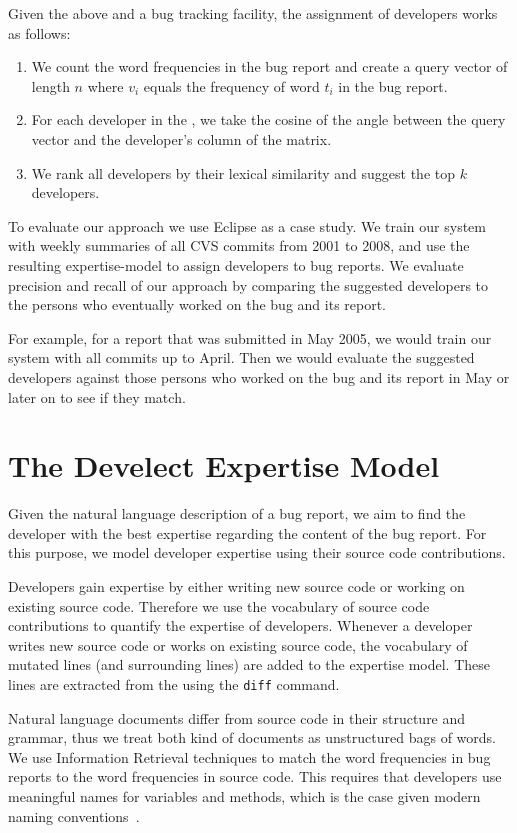 \documentclass[10pt]{book}
\begin{document}
Given the above \TAM and a bug tracking facility, the assignment of developers works as follows:

\begin{enumerate}
\item We count the word frequencies in the bug report and create a query vector of length $n$ where $v_i$ equals the frequency of word $t_i$ in the bug report. 
\item For each developer in the \TAM, we take the cosine of the angle between the query vector and the developer's column of the matrix.
\item We rank all developers by their lexical similarity and suggest the top $k$ developers.
\end{enumerate}

To evaluate our approach we use Eclipse as a case study. We train our system with weekly summaries of all CVS commits from 2001 to 2008, and use the resulting expertise-model to assign developers to bug reports. We evaluate precision and recall of our approach by comparing the suggested developers to the persons who eventually worked on the bug and its report.

For example, for a report that was submitted in May 2005, we would train our system with all commits up to April. Then we would evaluate the suggested developers against those persons who worked on the bug and its report in May or later on to see if they match.

 

\section{The Develect Expertise Model}\label{sec:algorithm}

Given the natural language description of a bug report, we aim to find the developer with the best expertise regarding the content of the bug report. For this purpose, we model developer expertise using their source code contributions. 

Developers gain expertise by either writing new source code or working on existing source code. Therefore we use the vocabulary of source code contributions to quantify the expertise of developers. Whenever a developer writes new source code or works on existing source code, the vocabulary of mutated lines (and surrounding lines) are added to the expertise model. These lines are extracted from the \VCS using the \verb$diff$ command.

Natural language documents differ from source code in their structure and grammar, thus we treat both kind of documents as unstructured bags of words. We use Information Retrieval techniques to match the word frequencies in bug reports to the word frequencies in source code. This requires that developers use meaningful names \eg for variables and methods, which is the case given modern naming conventions~\cite{Kuhn07a}. 
\end{document}

